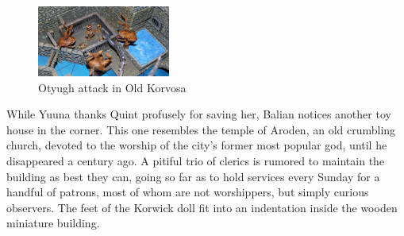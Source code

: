 \begin{figure}[h]
	\centering
	\includegraphics[width=0.39\textwidth]{images/Otyugh-attack-in-Old-Korvosa-550450012.jpg}
	\caption{Otyugh attack in Old Korvosa}
	\label{fig:Otyugh-attack-in-Old-Korvosa-550450012}
\end{figure}

While Yuuna thanks Quint profusely for saving her, Balian notices another toy house in the corner. This one resembles the temple of Aroden, an old crumbling church, devoted to the worship of the city's former most popular god, until he disappeared a century ago. A pitiful trio of clerics is rumored to maintain the building as best they can, going so far as to hold services every Sunday for a handful of patrons, most of whom are not worshippers, but simply curious observers. The feet of the Korwick doll fit into an indentation inside the wooden miniature building.\\

